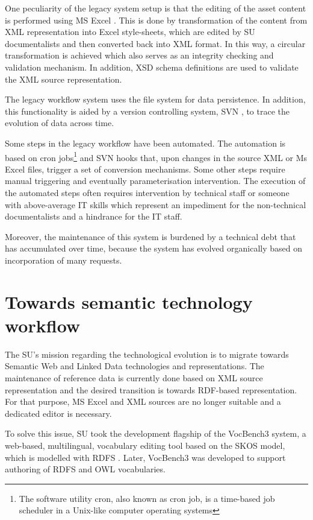 	One peculiarity of the legacy system setup is that the editing of the asset content is performed using MS Excel \citep{excel}. This is done by transformation of the content from XML representation into Excel style-sheets, which are edited by SU documentalists and then converted back into XML format. In this way, a circular transformation is achieved which also serves as an integrity checking and validation mechanism. In addition, XSD \citep{xsd1.1-spec} schema definitions are used to validate the XML source representation.
	 
	The legacy workflow system uses the file system for data persistence. In addition, this functionality is aided by a version controlling system, SVN \cite{svn}, to trace the evolution of data across time.
	 
	Some steps in the legacy workflow have been automated. The automation is based on cron jobs\footnote{The software utility cron, also known as cron job, is a time-based job scheduler in a Unix-like computer operating systems} and SVN hooks that, upon changes in the source XML or Ms Excel files, trigger a set of conversion mechanisms.  Some other steps require manual triggering and eventually parameterisation intervention. The execution of the automated steps often requires intervention by technical staff or someone with above-average IT skills which represent an impediment for the non-technical documentalists and a hindrance for the IT staff.
	 
	Moreover, the maintenance of this system is burdened by a technical debt that has accumulated over time, because the system has evolved organically based on incorporation of many requests. 
	
	\section{Towards semantic technology workflow}
	
	The SU's mission regarding the technological evolution is to migrate towards Semantic Web and Linked Data technologies and representations. The maintenance of reference data is currently done based on XML source representation and the desired transition is towards RDF-based representation\citep{rdf11,rdf11-semantics}. For that purpose, MS Excel and XML sources are no longer suitable and a dedicated editor is necessary.
	
	To solve this issue, SU took the development flagship of the VocBench3 \citep{stellatovocbench, stellato2017towards} system, a web-based, multilingual, vocabulary editing tool based on the SKOS \citep{skos-spec} model, which is modelled with RDFS \citep{rdfs1-spec,rdfs11-spec}. Later, VocBench3 was developed to support authoring of RDFS \citep{rdfs11-spec} and OWL \citep{owl2.0} vocabularies.
	
